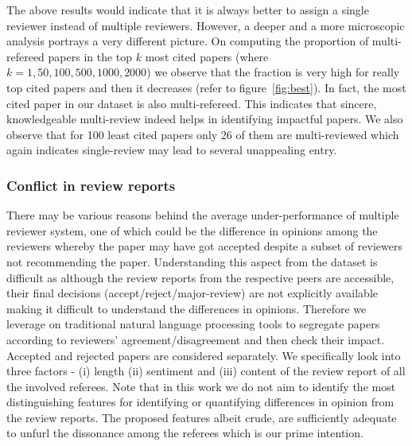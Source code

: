 The above results would indicate that it is always better to assign a single reviewer instead of multiple reviewers. However, 
a deeper and a more microscopic analysis portrays a very different picture. 
On  computing the proportion of multi-refereed papers in the top $k$ most cited papers (where $k = 1,50,100,500,1000,2000$) we observe that the 
fraction is very high for really top cited papers and then it decreases (refer to figure~\ref{fig:best}).
In fact, the most cited paper in our dataset is also multi-refereed.  
This indicates that sincere, knowledgeable multi-review indeed helps in identifying impactful papers. 
We also observe that for 100 least cited papers only 26 of them are 
multi-reviewed which again indicates single-review may lead to several unappealing entry. 

\subsubsection{Conflict in review reports}
There may be various reasons behind the average under-performance of multiple reviewer system, 
one of which could be the difference in opinions among the reviewers whereby the paper may have got accepted despite 
a subset of  reviewers  not recommending the paper.
Understanding this aspect from the dataset is difficult as 
although the review reports from the respective peers are accessible, their final decisions (accept/reject/major-review) are 
not explicitly available making it difficult to understand the differences in opinions. 
Therefore we leverage on traditional natural language processing tools 
to segregate papers according to reviewers' agreement/disagreement and then check their impact. Accepted and rejected papers are considered separately.
We specifically look into three factors - (i) length (ii) sentiment and (iii) content of the review report of all the involved referees. Note that 
in this work we do not aim to identify the most distinguishing features for identifying or 
quantifying differences in opinion from the review reports. The proposed features albeit crude, are sufficiently adequate to unfurl the 
dissonance among the referees which is our 
prime intention.


